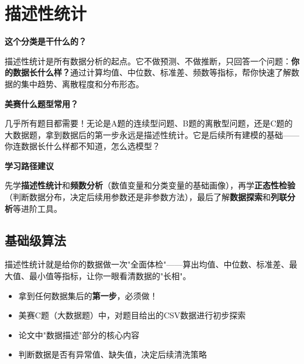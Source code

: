 \chapter{描述性统计}

\begin{chapteroverview}
\textbf{这个分类是干什么的？}

描述性统计是所有数据分析的起点。它不做预测、不做推断，只回答一个问题：\textbf{你的数据长什么样？}通过计算均值、中位数、标准差、频数等指标，帮你快速了解数据的集中趋势、离散程度和分布形态。

\textbf{美赛什么题型常用？}

几乎所有题目都需要！无论是A题的连续型问题、B题的离散型问题，还是C题的大数据题，拿到数据后的第一步永远是描述性统计。它是后续所有建模的基础——你连数据长什么样都不知道，怎么选模型？

\textbf{学习路径建议}

先学\textbf{描述性统计}和\textbf{频数分析}（数值变量和分类变量的基础画像），再学\textbf{正态性检验}（判断数据分布，决定后续用参数还是非参数方法），最后了解\textbf{数据探索}和\textbf{列联分析}等进阶工具。
\end{chapteroverview}

\section{基础级算法}


\begin{algointro}
描述性统计就是给你的数据做一次"全面体检"——算出均值、中位数、标准差、最大值、最小值等指标，让你一眼看清数据的"长相"。
\end{algointro}

\begin{algoscene}
\begin{itemize}
    \item 拿到任何数据集后的\textbf{第一步}，必须做！
    \item 美赛C题（大数据题）中，对题目给出的CSV数据进行初步探索
    \item 论文中"数据描述"部分的核心内容
    \item 判断数据是否有异常值、缺失值，决定后续清洗策略
\end{itemize}
\end{algoscene}

